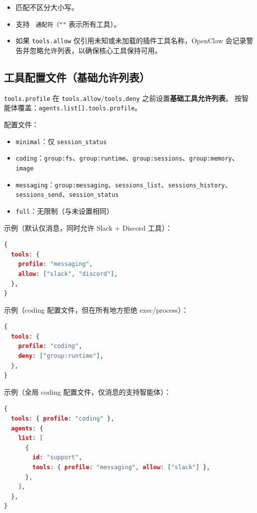 \begin{itemize}
  \item 匹配不区分大小写。
  \item 支持 \texttt{\textit{} 通配符（\texttt{"}"} 表示所有工具）。
  \item 如果 \texttt{tools.allow} 仅引用未知或未加载的插件工具名称，OpenClaw 会记录警告并忽略允许列表，以确保核心工具保持可用。
\end{itemize}


\subsection{工具配置文件（基础允许列表）}


\texttt{tools.profile} 在 \texttt{tools.allow}/\texttt{tools.deny} 之前设置\textbf{基础工具允许列表}。
按智能体覆盖：\texttt{agents.list[].tools.profile}。

配置文件：

\begin{itemize}
  \item \texttt{minimal}：仅 \texttt{session\_status}
  \item \texttt{coding}：\texttt{group:fs}、\texttt{group:runtime}、\texttt{group:sessions}、\texttt{group:memory}、\texttt{image}
  \item \texttt{messaging}：\texttt{group:messaging}、\texttt{sessions\_list}、\texttt{sessions\_history}、\texttt{sessions\_send}、\texttt{session\_status}
  \item \texttt{full}：无限制（与未设置相同）
\end{itemize}


示例（默认仅消息，同时允许 Slack + Discord 工具）：

\begin{lstlisting}[language=json]
{
  tools: {
    profile: "messaging",
    allow: ["slack", "discord"],
  },
}
\end{lstlisting}


示例（coding 配置文件，但在所有地方拒绝 exec/process）：

\begin{lstlisting}[language=json]
{
  tools: {
    profile: "coding",
    deny: ["group:runtime"],
  },
}
\end{lstlisting}


示例（全局 coding 配置文件，仅消息的支持智能体）：

\begin{lstlisting}[language=json]
{
  tools: { profile: "coding" },
  agents: {
    list: [
      {
        id: "support",
        tools: { profile: "messaging", allow: ["slack"] },
      },
    ],
  },
}
\end{lstlisting}


